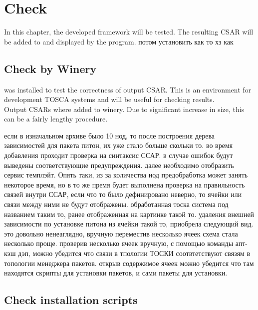 
\chapter{Check}\label{chap:check}
In this chapter, the developed framework will be tested.
The resulting CSAR will be added to  and displayed by the program.
потом установить как то хз как
\fi
\section{Check by Winery}
  was installed to test the correctness of output CSAR. 
 This is an environment for development TOSCA systems and will be useful for checking results. \\
 Output CSARs where added to winery. 
 Due to significant increase in size, this can be a fairly lengthy procedure.

если в изначальном архиве было 10 нод, то после построения дерева зависимостей для пакета питон, их уже стало больше скольки то.
во время добавления проходит проверка на синтаксис ССАР. в случае ошибок будут выведены соответствующие предупреждения.
далее необходимо отобразить сервис темплэйт. Опять таки, из за количества нод предобработка может занять некоторое время, но в то же премя будет выполнена проверка на правильность связей внутри ССАР, если что то было дефинировано неверно, то ячейки или связи между ними не будут отображены.
обработанная тоска система под названием таким то, ранее отображенная на картинке такой то. удаления внешней зависимости по установке питона из ячейки такой то, приобрела следующий вид.
это довольно ненеаглядно, вручную переместив несколько ячеек схема стала несколько проще. проверив несколько ячеек вручную, с помощью команды апт-кэш дэп, можно убедится что связи в тпологии ТОСКИ соотвтетствуют связям в топологии менеджера пакетов.
открыв содержимое ячеек можно убедится что там находятся скрипты для установки пакетов, и сами пакеты для установки.
 
\fi
\section{Check installation scripts}
\fi